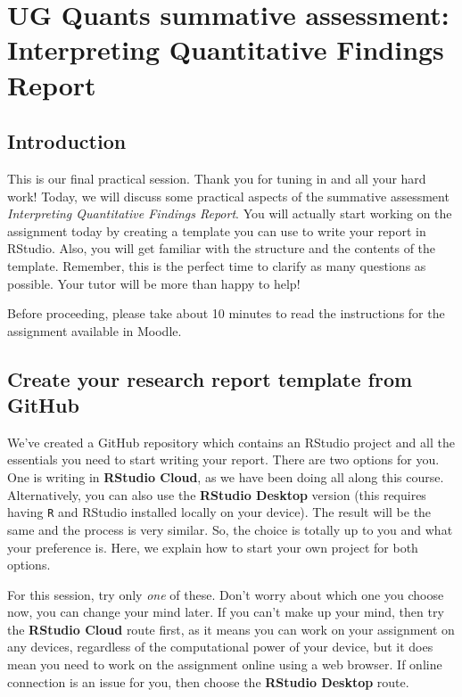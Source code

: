\documentclass[
]{book}
\begin{document}
\hypertarget{ug-quants-summative-assessment-interpreting-quantitative-findings-report}{%
\chapter{UG Quants summative assessment: Interpreting Quantitative Findings Report}\label{ug-quants-summative-assessment-interpreting-quantitative-findings-report}}

\hypertarget{introduction-3}{%
\section{Introduction}\label{introduction-3}}

This is our final practical session. Thank you for tuning in and all your hard work! Today, we will discuss some practical aspects of the summative assessment \emph{Interpreting Quantitative Findings Report}. You will actually start working on the assignment today by creating a template you can use to write your report in RStudio. Also, you will get familiar with the structure and the contents of the template. Remember, this is the perfect time to clarify as many questions as possible. Your tutor will be more than happy to help!

Before proceeding, please take about 10 minutes to read the instructions for the assignment available in Moodle.

\hypertarget{create-your-research-report-template-from-github}{%
\section{Create your research report template from GitHub}\label{create-your-research-report-template-from-github}}

We've created a GitHub repository which contains an RStudio project and all the essentials you need to start writing your report. There are two options for you. One is writing in \textbf{RStudio Cloud}, as we have been doing all along this course. Alternatively, you can also use the \textbf{RStudio Desktop} version (this requires having \texttt{R} and RStudio installed locally on your device). The result will be the same and the process is very similar. So, the choice is totally up to you and what your preference is. Here, we explain how to start your own project for both options.

For this session, try only \emph{one} of these. Don't worry about which one you choose now, you can change your mind later. If you can't make up your mind, then try the \textbf{RStudio Cloud} route first, as it means you can work on your assignment on any devices, regardless of the computational power of your device, but it does mean you need to work on the assignment online using a web browser. If online connection is an issue for you, then choose the \textbf{RStudio Desktop} route.
\end{document}
